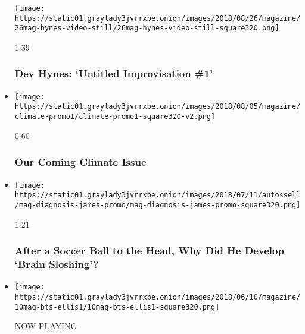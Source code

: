 \begin{itemize}
  \texttt{[image: https://static01.graylady3jvrrxbe.onion/images/2018/08/26/magazine/26mag-hynes-video-still/26mag-hynes-video-still-square320.png]}

  1:39

  \hypertarget{dev-hynes-untitled-improvisation-1}{%
  \subsubsection{Dev Hynes: `Untitled Improvisation
  \#1'}\label{dev-hynes-untitled-improvisation-1}}
\item
  \href{https://www.nytimes3xbfgragh.onion/video/magazine/100000006025347/our-coming-climate-issue.html?action=click\&module=video-series-bar\&region=header\&pgtype=Article\&playlistId=video/magazine}{}

  \texttt{[image: https://static01.graylady3jvrrxbe.onion/images/2018/08/05/magazine/climate-promo1/climate-promo1-square320-v2.png]}

  0:60

  \hypertarget{our-coming-climate-issue}{%
  \subsubsection{Our Coming Climate
  Issue}\label{our-coming-climate-issue}}
\item
  \href{https://www.nytimes3xbfgragh.onion/video/magazine/100000006000313/after-taking-a-soccer-ball-to-the-head-an-18-year-old-student-develops-a-mental-fogginess.html?action=click\&module=video-series-bar\&region=header\&pgtype=Article\&playlistId=video/magazine}{}

  \texttt{[image: https://static01.graylady3jvrrxbe.onion/images/2018/07/11/autossell/mag-diagnosis-james-promo/mag-diagnosis-james-promo-square320.png]}

  1:21

  \hypertarget{after-a-soccer-ball-to-the-head-why-did-he-develop-brain-sloshing}{%
  \subsubsection{After a Soccer Ball to the Head, Why Did He Develop
  `Brain
  Sloshing'?}\label{after-a-soccer-ball-to-the-head-why-did-he-develop-brain-sloshing}}
\item
  \texttt{[image: https://static01.graylady3jvrrxbe.onion/images/2018/06/10/magazine/10mag-bts-ellis1/10mag-bts-ellis1-square320.png]}

  NOW PLAYING


\end{itemize}
